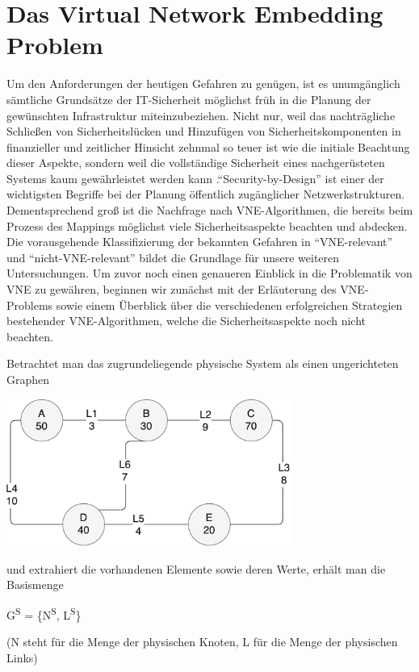 \documentclass{lni}
\begin{document}
\section{Das Virtual Network Embedding Problem}
\label{sec:VNE-Problem}
Um den Anforderungen der heutigen Gefahren zu genügen, ist es unumgänglich sämtliche Grundsätze der IT-Sicherheit möglichst früh in die Planung der gewünschten Infrastruktur miteinzubeziehen. Nicht nur, weil das nachträgliche Schließen von Sicherheitslücken und Hinzufügen von Sicherheitskomponenten in finanzieller und zeitlicher Hinsicht zehnmal so teuer ist wie die initiale Beachtung dieser Aspekte, sondern weil die vollständige Sicherheit eines nachgerüsteten Systems kaum gewährleistet werden kann \cite{Cole}."`Security-by-Design"' ist einer der wichtigsten Begriffe bei der Planung öffentlich zugänglicher Netzwerkstrukturen. Dementsprechend groß ist die Nachfrage nach VNE-Algorithmen, die bereits beim Prozess des Mappings möglichst viele Sicherheitsaspekte beachten und abdecken. Die vorausgehende Klassifizierung der bekannten Gefahren in "`VNE-relevant"' und "`nicht-VNE-relevant"' bildet die Grundlage für unsere weiteren Untersuchungen. Um zuvor noch einen genaueren Einblick in die Problematik von VNE zu gewähren, beginnen wir zunächst mit der Erläuterung des VNE-Problems sowie einem Überblick über die verschiedenen erfolgreichen Strategien bestehender VNE-Algorithmen, welche die Sicherheitsaspekte noch nicht beachten. 

Betrachtet man das zugrundeliegende physische System als einen ungerichteten Graphen
\begin{center}
	\includegraphics[width=0.7\textwidth]{physical_structure2.pdf}\newline
\end{center}
\vspace*{1cm}

und extrahiert die vorhandenen Elemente sowie deren Werte, erhält man die Basismenge
\begin{center}
G\textsuperscript{S} = \{N\textsuperscript{S}, L\textsuperscript{S}\}\newline

(N steht für die Menge der physischen Knoten, L für die Menge der physischen Links)
\end{center}
\end{document}
